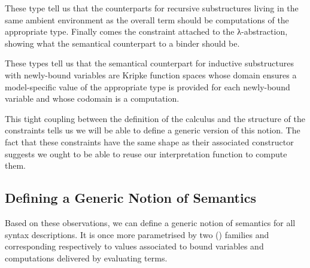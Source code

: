 \noindent\begin{minipage}{0.4\textwidth}
\end{minipage}\begin{minipage}{0.6\textwidth}
  \begin{AgdaSuppressSpace}
  \end{AgdaSuppressSpace}
\end{minipage}

These type tell us that the counterparts for recursive
substructures living in the same ambient environment as
the overall term should be computations of the appropriate
type.
%
Finally comes the constraint attached to the λ-abstraction,
showing what the semantical counterpart to a binder should be.

\noindent\begin{minipage}{0.4\textwidth}
\end{minipage}\begin{minipage}{0.6\textwidth}
\end{minipage}

These types tell us that the semantical counterpart for inductive
substructures with newly-bound variables are Kripke function spaces
whose domain ensures a model-specific value  of the appropriate
type is provided for each newly-bound variable and whose codomain is
a computation.

This tight coupling between the definition of the calculus and the
structure of the  constraints tells us we will be able
to define a generic version of this notion. The fact that these
constraints have the same shape as their associated constructor
suggests we ought to be able to reuse our interpretation function
 to compute them.

\subsection{Defining a Generic Notion of Semantics}

Based on these observations, we can define a generic notion of semantics
for all syntax descriptions. It is once more parametrised by two
{()} families  and  corresponding
respectively to values associated to bound variables and computations
delivered by evaluating terms.

